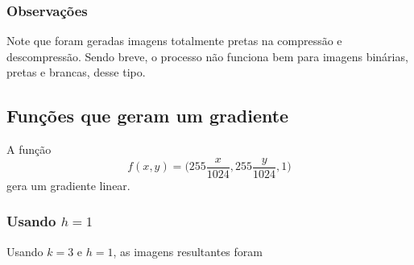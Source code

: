 \documentclass{article}
\begin{document}
\subsubsection{Observações}

Note que foram geradas imagens totalmente pretas na compressão e descompressão.
Sendo breve, o processo não funciona bem para imagens binárias, pretas e brancas,
desse tipo.

\subsection{Funções que geram um gradiente}

A função
\begin{equation}
  f(x,y) = \Biggl( 255 \dfrac{x}{1024} , 255 \dfrac{y}{1024}, 1 \Biggr)
\end{equation}
gera um gradiente linear.

\subsubsection[Usando h=1]{Usando $h=1$}

Usando $k=3$ e $h=1$, as imagens resultantes foram
\end{document}
